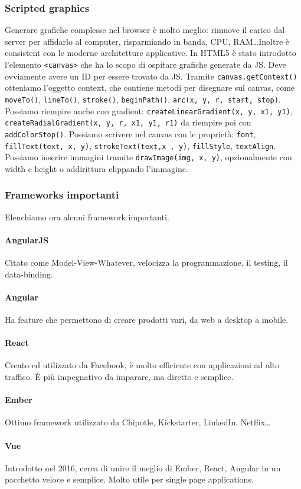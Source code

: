 \documentclass[11pt]{article}
\newcommand{\code}[1]{\texttt{#1}}
\begin{document}
\subsubsection{Scripted graphics}
Generare grafiche complesse nel browser è molto meglio: rimuove il carico dal server per affidarlo al computer, risparmiando in banda, CPU, RAM\dots Inoltre è consistent con le moderne architetture applicative. In HTML5 è stato introdotto l'elemento \code{<canvas>} che ha lo scopo di ospitare grafiche generate da JS. Deve ovviamente avere un ID per essere trovato da JS. Tramite \code{canvas.getContext()} otteniamo l'oggetto context, che contiene metodi per disegnare sul canvas, come \code{moveTo()}, \code{lineTo()}, \code{stroke()}, \code{beginPath()}, \code{arc(x, y, r, start, stop)}. Possiamo riempire anche con gradient: \code{createLinearGradient(x, y, x1, y1)}, \code{createRadialGradient(x, y, r, x1, y1, r1)} da riempire poi con \code{addColorStop()}. Possiamo scrivere nel canvas con le proprietà: \code{font}, \code{fillText(text, x, y)}, \code{strokeText(text,x , y)}, \code{fillStyle}, \code{textAlign}. Possiamo inserire immagini tramite \code{drawImage(img, x, y)}, opzionalmente con width e height o addirittura clippando l'immagine. 
\subsubsection{Frameworks importanti}
Elenchiamo ora alcuni framework importanti.
\paragraph{AngularJS} Citato come Model-View-Whatever, velocizza la programmazione, il testing, il data-binding.
\paragraph{Angular} Ha feature che permettono di creare prodotti vari, da web a desktop a mobile.
\paragraph{React} Creato ed utilizzato da Facebook, è molto efficiente con applicazioni ad alto traffico. È più impegnativo da imparare, ma diretto e semplice. 
\paragraph{Ember} Ottimo framework utilizzato da Chipotle, Kickstarter, LinkedIn, Netflix\dots
\paragraph{Vue} Introdotto nel 2016, cerca di unire il meglio di Ember, React, Angular in un pacchetto veloce e semplice. Molto utile per single page applications. 
\end{document}
